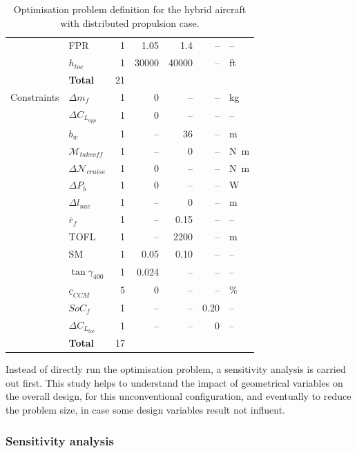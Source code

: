 \begin{table}[h!]
\begin{tabular}{l l r r r r l}
		& FPR & 1 & \num{1.05} & \num{1.4} & -- & -- \\
		& $h_{toc}$ & 1 & \num{30000} & \num{40000} & -- & ft \\
		& \textbf{Total} & 21 & & & & \\
		\hline
		Constraints & $\Delta m_{f}$ & 1 & 0 & -- & -- & \si{\kilogram} \\
		& $\Delta C_{L_{app}}$ & 1 & 0 & -- & -- & -- \\
		& $b_w$ & 1 & -- & \num{36} & -- & \si{\meter} \\
		& $\mathcal{M}_{takeoff}$ & 1 & -- & \num{0} & -- & \si{\newton\meter}  \\
		& $\Delta \mathcal{N}_{cruise}$ & 1 & \num{0} & -- & -- & \si{\newton\meter} \\
		& $\Delta P_{b}$ & 1 & \num{0} & -- & -- & \si{\watt} \\
		& $\Delta l_{nac}$ & 1 & -- & \num{0} & -- & \si{\meter} \\
		& $\bar{r}_f$ & 1 & -- & \num{0.15} & -- & -- \\
		& TOFL & 1 & -- & \num{2200} & -- & \si{\meter} \\
		& SM & 1 & \num{0.05} & \num{0.10} & -- & -- \\
		& $\tan \gamma_{400}$ & 1 & \num{0.024} & -- & -- & -- \\
		& $\underline{c}_{CCM}$ & 5 & \num{0} & -- & -- & \% \\
		& $SoC_f$ & 1 & -- & -- & \num{0.20} & -- \\
		& $\Delta C_{L_{toc}}$ & 1 & -- & -- & 0 & -- \\
		& \textbf{Total} & 17 & & & & \\
		\hline    	
	\end{tabular} 
	\caption{Optimisation problem definition for the hybrid aircraft with distributed propulsion case.}
	\label{tab:hybrid_dep_problem_optimisation_definition}
\end{table}

Instead of directly run the optimisation problem, a sensitivity analysis is carried out first. 
This study helps to understand the impact of geometrical variables on the overall design, for this unconventional configuration, and eventually to reduce the problem size, in case some design variables result not influent. 

\subsubsection{Sensitivity analysis}
\label{subsubsec:chap3_hybrid_sens_an}

